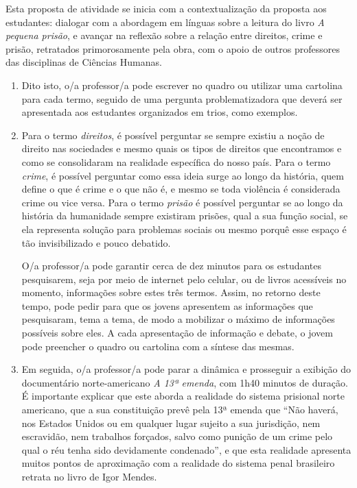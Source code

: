 \documentclass[11pt]{extarticle}
\begin{document}
Esta proposta de atividade se inicia com a
contextualização da proposta aos estudantes: dialogar com a abordagem em
línguas sobre a leitura do livro \emph{A pequena prisão}, e avançar na
reflexão sobre a relação entre direitos, crime e prisão, retratados
primorosamente pela obra, com o apoio de outros professores das disciplinas 
de Ciências Humanas. 
\begin{enumerate}

\item Dito isto, o/a professor/a pode escrever no
quadro ou utilizar uma cartolina para cada termo, seguido de uma
pergunta problematizadora que deverá ser apresentada aos estudantes
organizados em trios, como exemplos. 

\item Para o termo \emph{direitos}, é
possível perguntar se sempre existiu a noção de direito nas sociedades e
mesmo quais os tipos de direitos que encontramos e como se consolidaram
na realidade específica do nosso país. Para o termo \emph{crime}, é possível
perguntar como essa ideia surge ao longo da história, quem define o que
é crime e o que não é, e mesmo se toda violência é considerada crime ou
vice versa. Para o termo \emph{prisão} é possível perguntar se ao longo da
história da humanidade sempre existiram prisões, qual a sua função
social, se ela representa solução para problemas sociais ou mesmo porquê
esse espaço é tão invisibilizado e pouco debatido. 

O/a professor/a pode
garantir cerca de dez minutos para os estudantes pesquisarem, seja por
meio de internet pelo celular, ou de livros acessíveis no momento,
informações sobre estes três termos. Assim, no retorno deste tempo, pode
pedir para que os jovens apresentem as informações que pesquisaram, tema
a tema, de modo a mobilizar o máximo de informações possíveis sobre
eles. A cada apresentação de informação e debate, o jovem pode preencher
o quadro ou cartolina com a síntese das mesmas.

\item Em seguida, o/a professor/a pode parar a dinâmica e prosseguir a
exibição do documentário norte-americano \emph{A 13ª emenda}, com 1h40
minutos de duração. É importante explicar que este aborda a realidade do
sistema prisional norte americano, que a sua constituição prevê pela 13ª
emenda que ``Não haverá, nos Estados Unidos ou em qualquer lugar sujeito
a sua jurisdição, nem escravidão, nem trabalhos forçados, salvo como
punição de um crime pelo qual o réu tenha sido devidamente condenado'', e
que esta realidade apresenta muitos pontos de aproximação com a
realidade do sistema penal brasileiro retrata no livro de Igor Mendes.


\end{enumerate}
\end{document}
